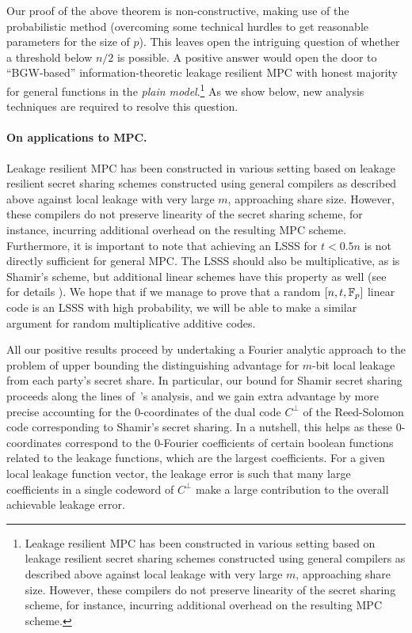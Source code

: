 Our proof of the above theorem is non-constructive, making use of the probabilistic method (overcoming some technical hurdles to get reasonable parameters for the size of $p$). This leaves open the intriguing question of whether a threshold below $n/2$ is possible. A positive answer would open the door to ``BGW-based'' information-theoretic leakage resilient MPC with honest majority for general functions in the \emph{plain model}.\footnote{Leakage resilient MPC has been constructed in various setting based on leakage resilient secret sharing schemes constructed using general compilers as described above against local leakage with very large $m$, approaching share size. However, these compilers do not preserve linearity of the secret sharing scheme, for instance, incurring additional overhead on the resulting MPC scheme.} 
As we show below, new analysis techniques are required to resolve this question.

\paragraph{On applications to MPC.}
Leakage resilient MPC has been constructed in various setting based on leakage resilient secret sharing schemes constructed using general compilers as described above against local leakage with very large $m$, approaching share size. However, these compilers do not preserve linearity of the secret sharing scheme, for instance, incurring additional overhead on the resulting MPC scheme. 
Furthermore, it is important to note that achieving an LSSS for $t<0.5n$ is not directly sufficient for general MPC. 
The LSSS should also be multiplicative, as is Shamir's scheme, but additional linear schemes have this property as well (see~\cite{CDM00} for details ). We hope that if we manage to prove that a random $[n,t,\mathbb{F}_p]$ linear code is an LSSS with high probability, we will be able to make a similar argument for random multiplicative additive codes.

All our positive results proceed by undertaking a Fourier analytic approach to the problem of upper bounding the distinguishing advantage for $m$-bit local leakage from each party's secret share.
In particular, our bound for Shamir secret sharing proceeds along the lines of~\cite{C:BDIR18}'s analysis, and we gain extra advantage by more precise accounting for the  
0-coordinates of the dual code $C^\bot$ of the Reed-Solomon code corresponding to Shamir's secret sharing. In a nutshell, this helps as these 0-coordinates correspond to the 0-Fourier coefficients of certain boolean functions related to the leakage functions, which are the largest coefficients. For a given local leakage function vector, the leakage error is such that many large coefficients in a single codeword of $C^\bot$ make a large contribution to the overall achievable leakage error. 

